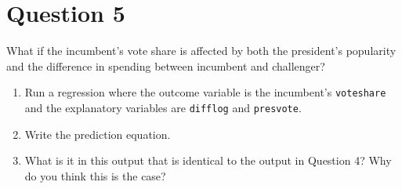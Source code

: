 \documentclass[12pt,letterpaper]{article}
\begin{document}
	\newpage	

\section*{Question 5}
\noindent What if the incumbent's vote share is affected by both the president's popularity and the difference in spending between incumbent and challenger? 
	\begin{enumerate}
		\item Run a regression where the outcome variable is the incumbent's \texttt{voteshare} and the explanatory variables are \texttt{difflog} and \texttt{presvote}.	\vspace{5cm}
	
	
		\item Write the prediction equation.	\vspace{5cm}
	
	
	
		\item What is it in this output that is identical to the output in Question 4? Why do you think this is the case?
	
	
	
	\end{enumerate}
\end{document}
